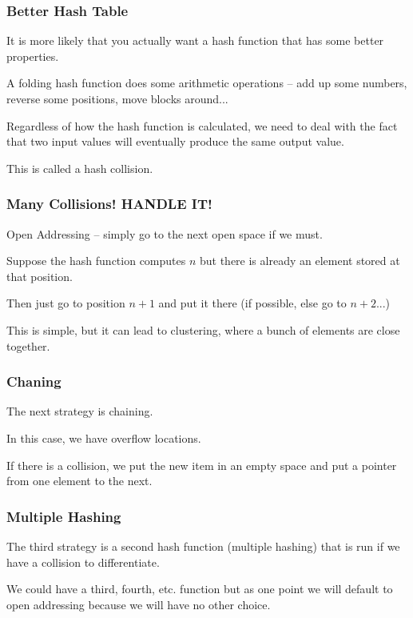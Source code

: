 \begin{frame}
\frametitle{Better Hash Table}
It is more likely that you actually want a hash function that has some better properties. 

A \alert{folding} hash function does some arithmetic operations -- add up some numbers, reverse some positions, move blocks around...

Regardless of how the hash function is calculated, we need to deal with the fact that two input values will eventually produce the same output value. 

This is called a \alert{hash collision}.

\end{frame}


\begin{frame}
\frametitle{Many Collisions! HANDLE IT!}

\alert{Open Addressing} -- simply go to the next open space if we must. 

Suppose the hash function computes $n$ but there is already an element stored at that position. 

Then just go to position $n+1$ and put it there (if possible, else go to $n+2$...)

This is simple, but it can lead to clustering, where a bunch of elements are close together.


\end{frame}

\begin{frame}
\frametitle{Chaning}

The next strategy is \alert{chaining}. 

In this case, we have overflow locations. 

If there is a collision, we put the new item in an empty space and put a pointer from one element to the next. 

\end{frame}


\begin{frame}
\frametitle{Multiple Hashing}

The third strategy is a second hash function (\alert{multiple hashing}) that is run if we have a collision to differentiate. 

We could have a third, fourth, etc. function but as one point we will default to open addressing because we will have no other choice.


\end{frame}



